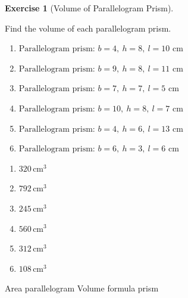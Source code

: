 \documentclass[
  letterpaper,
  DIV=11,
  numbers=noendperiod]{scrreprt}
\theoremstyle{definition}
\newtheorem{exercise}{Exercise}[chapter]
\theoremstyle{remark}
\begin{document}
\begin{exercise}[Volume of Parallelogram
Prism]\protect\hypertarget{exr-vol-5}{}\label{exr-vol-5}

Find the volume of each parallelogram prism.

\begin{enumerate}
\def\labelenumi{\alph{enumi})}
\item
  \(\text{Parallelogram prism: }b=4,\ h=8,\ l=10\text{ cm}\)
\item
  \(\text{Parallelogram prism: }b=9,\ h=8,\ l=11\text{ cm}\)
\item
  \(\text{Parallelogram prism: }b=7,\ h=7,\ l=5\text{ cm}\)
\item
  \(\text{Parallelogram prism: }b=10,\ h=8,\ l=7\text{ cm}\)
\item
  \(\text{Parallelogram prism: }b=4,\ h=6,\ l=13\text{ cm}\)
\item
  \(\text{Parallelogram prism: }b=6,\ h=3,\ l=6\text{ cm}\)
\end{enumerate}

\begin{tcolorbox}[enhanced jigsaw, opacitybacktitle=0.6, coltitle=black, arc=.35mm, colframe=quarto-callout-tip-color-frame, colback=white, bottomrule=.15mm, left=2mm, colbacktitle=quarto-callout-tip-color!10!white, titlerule=0mm, opacityback=0, title=\textcolor{quarto-callout-tip-color}{\faLightbulb}\hspace{0.5em}{🔍 View Solution}, leftrule=.75mm, breakable, rightrule=.15mm, bottomtitle=1mm, toptitle=1mm, toprule=.15mm]

\begin{enumerate}
\def\labelenumi{\alph{enumi})}
\item
  \(320\,\text{cm}^{3}\)
\item
  \(792\,\text{cm}^{3}\)
\item
  \(245\,\text{cm}^{3}\)
\item
  \(560\,\text{cm}^{3}\)
\item
  \(312\,\text{cm}^{3}\)
\item
  \(108\,\text{cm}^{3}\)
\end{enumerate}

\end{tcolorbox}

{Area parallelogram} {Volume formula prism}

\end{exercise}
\end{document}
